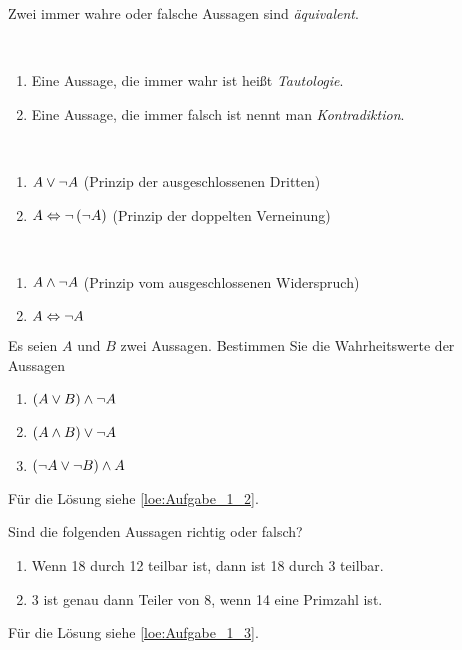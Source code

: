 \begin{note}
Zwei immer wahre oder falsche Aussagen sind \emph{äquivalent}.
\end{note}

\begin{definition}~
\begin{enumerate}
\item Eine Aussage, die immer wahr ist heißt \emph{Tautologie}.
\item Eine Aussage, die immer falsch ist nennt man \emph{Kontradiktion}.
\end{enumerate}
\end{definition}

\begin{example}[zu Tautologie]~
\begin{enumerate}
\item $A \vee \neg A$ (Prinzip der ausgeschlossenen Dritten)
\item $A \Leftrightarrow \neg \left(\neg A\right)$ (Prinzip der doppelten Verneinung)
\end{enumerate}
\end{example}

\begin{example}[zu Kontradiktion]~
\begin{enumerate}
\item $A \wedge \neg A$ (Prinzip vom ausgeschlossenen Widerspruch)
\item $A \Leftrightarrow \neg A$
\end{enumerate}
\end{example}

\begin{exercise}
Es seien $A$ und $B$ zwei Aussagen. Bestimmen Sie die Wahrheitswerte der Aussagen
\begin{multicols}{3}
\begin{enumerate}
\item $\left(A \vee B\right) \wedge \neg A$ \label{exc:Aufgabe_1_2_a}
\item $\left(A \wedge B\right) \vee \neg A$ \label{exc:Aufgabe_1_2_b}
\item $\left(\neg A \vee \neg B\right) \wedge A$ \label{exc:Aufgabe_1_2_c}
\end{enumerate}
\end{multicols}
Für die Lösung siehe \vref{loe:Aufgabe_1_2}.
\label{exc:Aufgabe_1_2}
\end{exercise}

\begin{exercise}
Sind die folgenden Aussagen richtig oder falsch?
\begin{enumerate}
\item Wenn 18 durch 12 teilbar ist, dann ist 18 durch 3 teilbar. \label{exc:Aufgabe_1_3_a}
\item 3 ist genau dann Teiler von 8, wenn 14 eine Primzahl ist. \label{exc:Aufgabe_1_3_b}
\end{enumerate}
Für die Lösung siehe \vref{loe:Aufgabe_1_3}.
\label{exc:Aufgabe_1_3}
\end{exercise}

